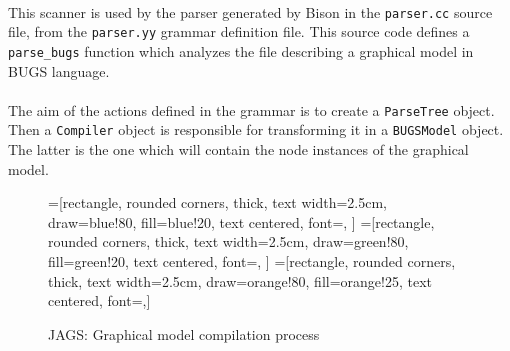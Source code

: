 \paragraph{}
This scanner is used by the parser generated by Bison in the \texttt{parser.cc} source file, from the \texttt{parser.yy} grammar definition file. This source code defines a \texttt{parse\_bugs} function which analyzes the file describing a graphical model in BUGS language.

\paragraph{}
The aim of the actions defined in the grammar is to create a \texttt{ParseTree} object. Then a \texttt{Compiler} object is responsible for transforming it in a \texttt{BUGSModel} object. The latter is the one which will contain the node instances of the graphical model.

\begin{figure}[h!]
\begin{center}
=[rectangle, rounded corners,
                                    thick,
                                    text width=2.5cm,
                                    draw=blue!80,
                                    fill=blue!20,
                                    text centered,
                                    font=\large,
                                    ]
=[rectangle, rounded corners,
                                    thick,
                                    text width=2.5cm,
                                    draw=green!80,
                                    fill=green!20,
                                    text centered,
                                    font=\large,
                                    ]
=[rectangle, rounded corners,
                                                thick,
                                                text width=2.5cm,
                                                draw=orange!80,
                                                fill=orange!25,
                                                text centered,
                                    font=\large,]
\label{fig:briques}
\caption{JAGS: Graphical model compilation process}
\end{center}
\end{figure}


